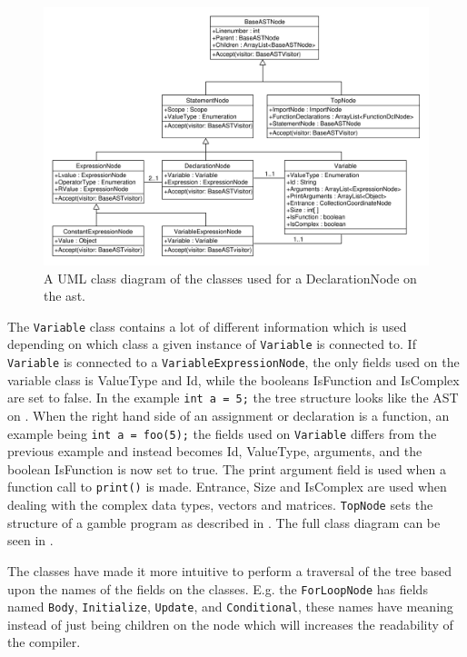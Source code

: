\begin{figure}[!ht]
\centering
 \includegraphics[width=1\textwidth]{figures/ClassDiagrams/ASTDeclarationNodeMoreInfo.pdf} %
\caption{A UML class diagram of the classes used for a DeclarationNode on the \acrshort{ast}.}\label{image:ASTDecl}
\vspace{-15pt}
\end{figure}

The \texttt{Variable} class contains a lot of different information which is used depending on which class a given instance of \texttt{Variable} is connected to.
If \texttt{Variable} is connected to a \texttt{VariableExpressionNode}, the only fields used on the variable class is ValueType and Id, while the booleans IsFunction and IsComplex are set to false.
In the example \texttt{int a = 5;} the tree structure looks like the AST on .
When the right hand side of an assignment or declaration is a function, an example being \texttt{int a = foo(5);} the fields used on \texttt{Variable} differs from the previous example and instead becomes Id, ValueType, arguments, and the boolean IsFunction is now set to true.
The print argument field is used when a function call to \texttt{print()} is made. 
Entrance, Size and IsComplex are used when dealing with the complex data types, vectors and matrices.
\texttt{TopNode} sets the structure of a \gls{gamble} program as described in .
The full class diagram can be seen in .

The classes have made it more intuitive to perform a traversal of the tree based upon the names of the fields on the classes.
E.g. the \texttt{ForLoopNode} has fields named \texttt{Body}, \texttt{Initialize}, \texttt{Update}, and \texttt{Conditional}, these names have meaning instead of just being children on the node which will increases the readability of the compiler.

